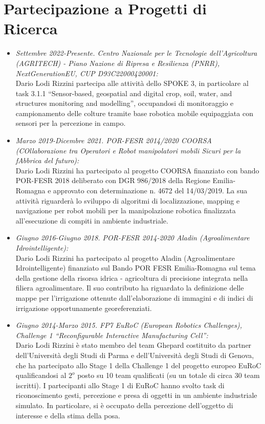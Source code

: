 \documentclass[11pt]{article}
\newcommand{\ITEMDATE}[1]{\item \textit{#1:}\\}
\begin{document}
\section*{Partecipazione a Progetti di Ricerca}

\begin{itemize}

\ITEMDATE{Settembre 2022-Presente. Centro Nazionale per le Tecnologie dell’Agricoltura (AGRITECH) - Piano Nazione di Ripresa e Resilienza (PNRR), NextGenerationEU, CUP D93C22000420001}
Dario Lodi Rizzini partecipa alle attività dello SPOKE 3, in particolare al task 3.1.1 ``Sensor-based, geospatial and digital crop, soil, water, and structures monitoring and modelling'', occupandosi di monitoraggio e campionamento delle colture tramite base robotica mobile equipaggiata con sensori per la percezione in campo. 

\ITEMDATE{Marzo 2019-Dicembre 2021. POR-FESR 2014/2020 COORSA (COllaborazione tra Operatori e Robot manipolatori mobili Sicuri per la fAbbrica del futuro)}
Dario Lodi Rizzini ha partecipato al progetto COORSA finanziato con bando POR-FESR 2018 deliberato con DGR
986/2018 della Regione Emilia-Romagna e approvato con determinazione n. 4672 del 14/03/2019.
La sua attivit\`a riguarder\`a lo sviluppo di algoritmi di localizzazione, mapping e navigazione per robot mobili 
per la manipolazione robotica finalizzata all'esecuzione di compiti in ambiente industriale. 

\ITEMDATE{Giugno 2016-Giugno 2018. POR-FESR 2014-2020 Aladin (Agroalimentare Idrointelligente)}
Dario Lodi Rizzini ha partecipato al progetto Aladin (Agroalimentare Idrointelligente) 
finanziato sul Bando POR FESR Emilia-Romagna sul tema della gestione della risorsa idrica - 
agricoltura di precisione integrata nella filiera agroalimentare. 
Il suo contributo ha riguardato la definizione delle mappe per l'irrigazione ottenute dall'elaborazione 
di immagini e di indici di irrigazione opportunamente georeferenziati.

\ITEMDATE{Giugno 2014-Marzo 2015. FP7 EuRoC (European Robotics Challenges), \\
           Challenge 1 ``Reconfigurable Interactive Manufacturing Cell''} 
Dario Lodi Rizzini \`e stato membro del team Ghepard costituito da partner dell'Universit\`a degli 
Studi di Parma e dell'Universit\`a degli Studi di Genova, che ha partecipato allo Stage 1 della 
Challenge 1 del progetto europeo EuRoC qualificandosi al $2^o$ posto su 10 team qualificati 
(su un totale di circa 30 team iscritti).
I partecipanti allo Stage 1 di EuRoC hanno svolto task di riconoscimento gesti, percezione e presa 
di oggetti in un ambiente industriale simulato. 
In particolare, si \`e occupato della percezione dell'oggetto di interesse e della stima della posa.


\end{itemize}
\end{document}
